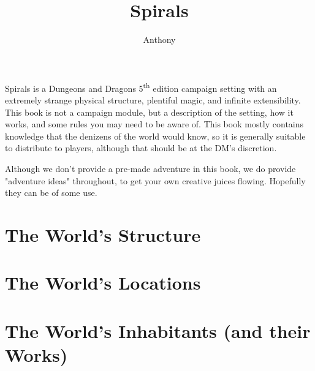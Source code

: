 \documentclass[a4paper]{book}
\title{Spirals}
\author{Anthony \censor{Super}}
\begin{document}
\setcounter{tocdepth}{1}
\maketitle


Spirals is a Dungeons and Dragons 5\textsuperscript{th} edition campaign setting with an extremely strange physical structure, plentiful magic, and infinite extensibility.
This book is not a campaign module, but a description of the setting, how it works, and some rules you may need to be aware of.
This book mostly contains knowledge that the denizens of the world would know, so it is generally suitable to distribute to players, although that should be at the DM's discretion.

Although we don't provide a pre-made adventure in this book, we do provide "adventure ideas" throughout, to get your own creative juices flowing.
Hopefully they can be of some use.

\listoftodos
\tableofcontents 

\part{The World's Structure}



\part{The World's Locations}




\part{The World's Inhabitants (and their Works)}




\printindex
\end{document}
